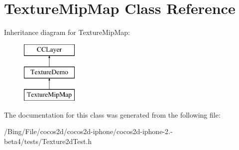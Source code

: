 \hypertarget{interface_texture_mip_map}{\section{Texture\-Mip\-Map Class Reference}
\label{interface_texture_mip_map}
}
Inheritance diagram for Texture\-Mip\-Map\-:\begin{figure}[H]
\begin{center}
\leavevmode
\includegraphics[height=3.000000cm]{interface_texture_mip_map}
\end{center}
\end{figure}


The documentation for this class was generated from the following file\-:\begin{DoxyCompactItemize}
\item 
/\-Bing/\-File/cocos2d/cocos2d-\/iphone/cocos2d-\/iphone-\/2.-\/beta4/tests/Texture2d\-Test.\-h\end{DoxyCompactItemize}
